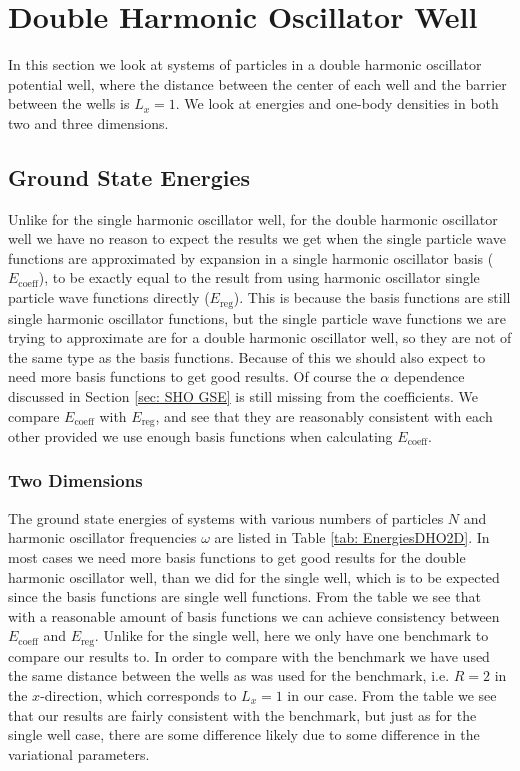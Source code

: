 \documentclass[../main.tex]{subfiles}
\begin{document}
\section{Double Harmonic Oscillator Well}

In this section we look at systems of particles in a double harmonic oscillator potential well, where the distance between the center of each well and the barrier between the wells is $L_x = 1$. We look at energies and one-body densities in both two and three dimensions.

\subsection{Ground State Energies}

Unlike for the single harmonic oscillator well, for the double harmonic oscillator well we have no reason to expect the results we get when the single particle wave functions are approximated by expansion in a single harmonic oscillator basis ($E_\textrm{coeff}$), to be exactly equal to the result from using harmonic oscillator single particle wave functions directly ($E_\textrm{reg}$). This is because the basis functions are still single harmonic oscillator functions, but the single particle wave functions we are trying to approximate are for a double harmonic oscillator well, so they are not of the same type as the basis functions. Because of this we should also expect to need more basis functions to get good results. Of course the $\alpha$ dependence discussed in Section \ref{sec: SHO GSE} is still missing from the coefficients. We compare $E_\textrm{coeff}$ with $E_\textrm{reg}$, and see that they are reasonably consistent with each other provided we use enough basis functions when calculating $E_\textrm{coeff}$.

\subsubsection{Two Dimensions}

The ground state energies of systems with various numbers of particles $N$ and harmonic oscillator frequencies $\omega$ are listed in Table \ref{tab: EnergiesDHO2D}. In most cases we need more basis functions to get good results for the double harmonic oscillator well, than we did for the single well, which is to be expected since the basis functions are single well functions. From the table we see that with a reasonable amount of basis functions we can achieve consistency between $E_\textrm{coeff}$ and $E_\textrm{reg}$. Unlike for the single well, here we only have one benchmark to compare our results to. In order to compare with the benchmark we have used the same distance between the wells as was used for the benchmark, i.e. $R=2$ in the $x$-direction, which corresponds to $L_x = 1$ in our case. From the table we see that our results are fairly consistent with the benchmark, but just as for the single well case, there are some difference likely due to some difference in the variational parameters.
\end{document}

